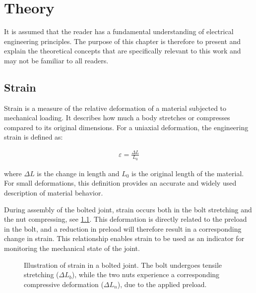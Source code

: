 \chapter{Theory} \label{sec:Theory}
It is assumed that the reader has a fundamental understanding of electrical engineering principles. The purpose of this chapter is therefore to present and explain the theoretical concepts that are specifically relevant to this work and may not be familiar to all readers.

\section{Strain}
Strain is a measure of the relative deformation of a material subjected to mechanical loading. It describes how much a body stretches or compresses compared to its original dimensions. For a uniaxial deformation, the engineering strain is defined as:

\begin{align} \label{eq:strain definition}
    \varepsilon=\frac{\Delta L}{L_{0}}
\end{align}

where $\Delta L$ is the change in length and $L_0$ is the original length of the material. For small deformations, this definition provides an accurate and widely used description of material behavior.

During assembly of the bolted joint, strain occurs both in the bolt stretching and the nut compressing, see \cref{fig:strain}. This deformation is directly related to the preload in the bolt, and a reduction in preload will therefore result in a corresponding change in strain. This relationship enables strain to be used as an indicator for monitoring the mechanical state of the joint.

\begin{figure}[H]
\centering

    \caption{Illustration of strain in a bolted joint. The bolt undergoes tensile stretching ($\Delta L_b$), while the two nuts experience a corresponding compressive deformation ($\Delta L_n$), due to the applied preload.}
    \label{fig:strain}
\end{figure}


